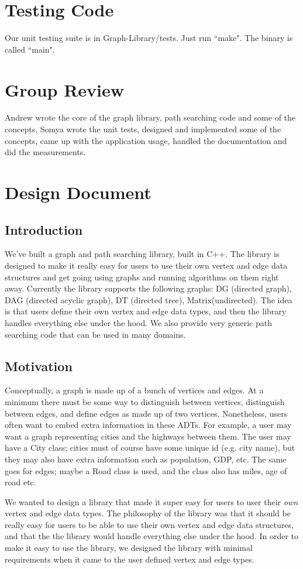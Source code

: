 \documentclass{article}
\begin{document}
\section{Testing Code}
Our unit testing suite is in Graph-Library/tests. Just run ``make". The binary is called ``main".

\section{Group Review}
Andrew wrote the core of the graph library, path searching code and some of the concepts. Somya wrote the unit tests, designed and implemented some of the concepts, came up with the application usage, handled the documentation and did the measurements.

\section{Design Document}

\subsection{Introduction}
We've built a graph and path searching library, built in C++. The library is designed to make it really easy for users to use their own vertex and edge data structures and get going using graphs and running algorithms on them right away. Currently the library supports the following graphs: DG (directed graph), DAG (directed acyclic graph), DT (directed tree), Matrix(undirected). The idea is that users define their own vertex and edge data types, and then the library handles everything else under the hood. We also provide very generic path searching code that can be used in many domains. 

\subsection{Motivation}
Conceptually, a graph is made up of a bunch of vertices and edges. At a minimum there must be some way to distinguish between vertices, distinguish between edges, and define edges as made up of two vertices. Nonetheless, users often want to embed extra information in these ADTs. For example, a user may want a graph representing cities and the highways between them. The user may have a City class; cities must of course have some unique id (e.g. city name), but they may also have extra information such as population, GDP, etc. The same goes for edges; maybe a Road class is used, and the class also has miles, age of road etc. 
\par
We wanted to design a library that made it super easy for users to user their \emph{own} vertex and edge data types.
The philosophy of the library was that it should be really easy for users to be able to use their own vertex and edge data structures, and that the the library would handle everything else under the hood. In order to make it easy to use the library, we designed the library with minimal requirements when it came to the user defined vertex and edge types. 
\end{document}
